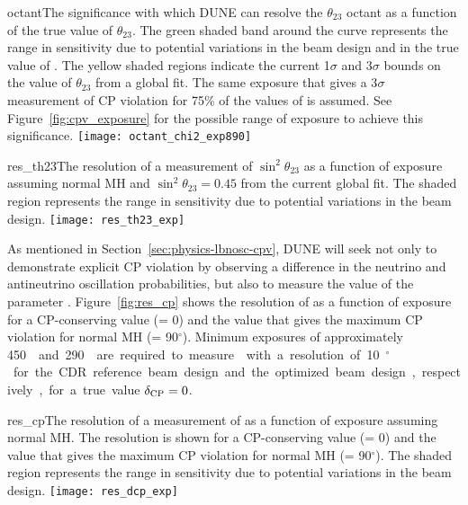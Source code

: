 \begin{cdrfigure}{octant}{The significance with which DUNE can resolve the $\theta_{23}$ octant as a function of the true value of $\theta_{23}$. The green shaded band around the curve represents the range in sensitivity due to potential variations in the beam design and in the true value of \deltacp. The yellow shaded regions indicate the current 1$\sigma$ and 3$\sigma$ bounds on the value of $\theta_{23}$ from a global fit.  The same exposure that gives a 3$\sigma$ measurement of CP violation for 75\% of the values of \deltacp is assumed.  See Figure~\ref{fig:cpv_exposure} for the possible range of exposure to achieve this significance.}
 \texttt{[image: octant\_chi2\_exp890]}
\end{cdrfigure}

\begin{cdrfigure}{res_th23}{The resolution of a measurement of $\sin^2\theta_{23}$ as a function of exposure assuming normal MH and $\sin^2\theta_{23} = 0.45$ from the current global fit. The shaded region represents the range in sensitivity due to potential variations in the beam design.  }
 \texttt{[image: res\_th23\_exp]}
\end{cdrfigure}


As mentioned in Section~\ref{sec:physics-lbnosc-cpv}, DUNE will seek
not only to demonstrate explicit CP violation by observing a
difference in the neutrino and antineutrino oscillation probabilities,
but also to measure the value of the parameter \deltacp.
Figure~\ref{fig:res_cp} shows the resolution of \deltacp as a function
of exposure for a CP-conserving value (\deltacp = 0) and the value
that gives the maximum CP violation for normal MH (\deltacp =
90\mbox{$^{\circ}$}).  Minimum exposures of approximately
\SI{450}~\ktMWyr{} and \SI{290}~\ktMWyr{} are required to measure
\deltacp with a resolution of 10\mbox{$^{\circ}$} for the CDR
reference beam design and the optimized beam design, respectively, for
a true value $\mdeltacp = 0$.

\begin{cdrfigure}{res_cp}{The resolution of a measurement of \deltacp as a function of exposure assuming normal MH.  The resolution is shown for a CP-conserving value (\deltacp = 0) and the value that gives the maximum CP violation for normal MH (\deltacp = 90\mbox{$^{\circ}$}). The shaded region represents the range in sensitivity due to potential variations in the beam design.  }
 \texttt{[image: res\_dcp\_exp]}
\end{cdrfigure}

